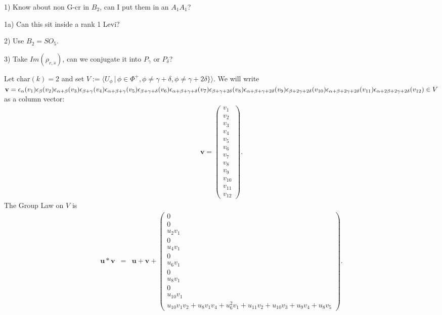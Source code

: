 1) Know about non G-cr in $B_2$, can I put them in an $A_1A_1$?

1a) Can this sit inside a rank 1 Levi?

2) Use $B_2=SO_5$.

3) Take $Im(\rho_{r,s})$, can we conjugate it into $P_\gamma$ or $P_\delta$?

Let $\mathrm{char}(k)=2$ and set $V:=\langle U_\phi\, |\, \phi \in \Phi^+, \phi \neq \gamma + \delta,\phi \neq \gamma+2\delta\} \rangle$. We will write
$
\mathbf{v} = \epsilon_\alpha(v_1) \epsilon_\beta(v_2) \epsilon_{\alpha+\beta}(v_3) \epsilon_{\beta+\gamma}(v_4) \epsilon_{\alpha+\beta+\gamma}(v_5) \epsilon_{\beta+\gamma+\delta}(v_6) \epsilon_{\alpha+\beta+\gamma+\delta}(v_7) \epsilon_{\beta+\gamma+2\delta}(v_8) \epsilon_{\alpha+\beta+\gamma+2\delta}(v_9) \\
\epsilon_{\beta+2\gamma+2\delta}(v_{10}) \epsilon_{\alpha+\beta+2\gamma+2\delta}(v_{11}) \epsilon_{\alpha+2\beta+2\gamma+2\delta}(v_{12}) \in V
$
as a column vector:
\begin{eqnarray*}
\mathbf{v} = \left( \begin{matrix}
	         v_1 \\
	         v_2 \\
	         v_3 \\
	         v_4 \\
	         v_5 \\
	         v_6 \\
	         v_7 \\
	         v_8 \\
	         v_9 \\
	         v_{10} \\
	         v_{11} \\
	         v_{12} 
	      \end{matrix}\right). 
\end{eqnarray*}
The Group Law on $V$ is
\begin{eqnarray*}
	     \mathbf{u}*
	     \mathbf{v}&=&
	     \mathbf{u} + \mathbf{v} +
	     \left( \begin{matrix}
	         0 \\
	         0 \\
	         u_2v_1\\
	         0 \\
	         u_4v_1 \\
	         0 \\
	         u_6v_1\\
	         0 \\
	         u_8v_1\\
	         0 \\
	         u_{10}v_1\\
	         u_{10}v_1v_2 + u_8v_1v_4 + u_6^2v_1 + u_{11}v_2 + u_{10}v_3 + u_9v_4 + u_8v_5
	         	\end{matrix}\right).
\end{eqnarray*}

